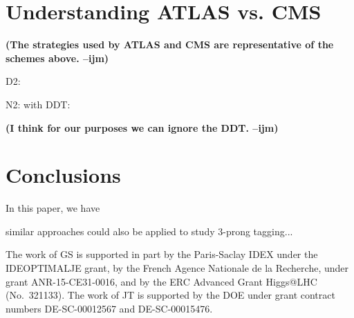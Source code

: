 \documentclass[11pt,letterpaper]{article}
\newcommand{\ijm}[1]{\textbf{\textcolor{llblue}{(#1 --ijm)}}}
\begin{document}




\section{Understanding ATLAS vs. CMS}

\ijm{The strategies used by ATLAS and CMS are representative of the schemes above. }

D2:\cite{Larkoski:2015kga}\cite{Larkoski:2014gra}

N2:\cite{Moult:2016cvt}
with DDT:\cite{Dolen:2016kst}

\ijm{I think for our purposes we can ignore the DDT. }

\section{Conclusions}

In this paper, we have

similar approaches could also be applied to study $3$-prong tagging...


\begin{acknowledgments}


The work of GS is supported in part by the Paris-Saclay IDEX under the
IDEOPTIMALJE grant, by the French Agence Nationale de la Recherche,
under grant ANR-15-CE31-0016, and by the ERC Advanced Grant Higgs@LHC
(No.\ 321133).
%
The work of JT is supported by the DOE under grant contract numbers DE-SC-00012567 and DE-SC-00015476.


\end{acknowledgments}



\appendix

%
%
%
%
%
%
\end{document}
